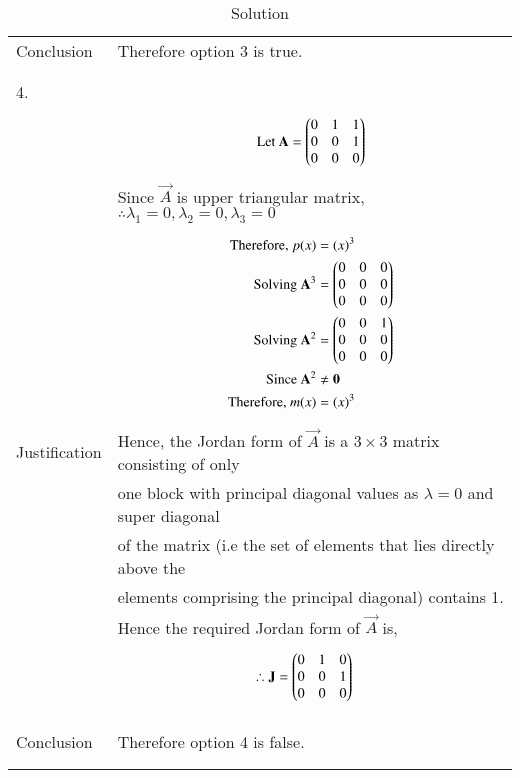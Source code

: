 \documentclass[journal,12pt]{IEEEtran}
\begin{document}
\begin{longtable}{|l|l|}
Conclusion&Therefore option 3 is true.\\
&\\
\hline
\pagebreak
\hline
&\\
4.&\\
&\parbox{6cm}{\begin{align*}
    \mbox{Let }\mathbf{A}&=\begin{pmatrix}0&1&1\\0&0&1\\0&0&0\end{pmatrix}\\
\end{align*}}\\
&Since $\vec{A}$ is upper triangular matrix, $\therefore \lambda_{1}=0,\lambda_{2}=0,\lambda_{3}=0$ \\
&\parbox{6cm}{\begin{align*}
    \mbox{Therefore, }p(x)&=(x)^3\\
    \mbox{Solving }\mathbf{A}^3&=\begin{pmatrix}0&0&0\\0&0&0\\0&0&0\end{pmatrix}\\
    \mbox{Solving }\mathbf{A}^2&=\begin{pmatrix}0&0&1\\0&0&0\\0&0&0\end{pmatrix}\\
    \mbox{Since }\mathbf{A}^2&\neq \mathbf{0}\\
    \mbox{Therefore, }m(x)&=(x)^3\\
    \end{align*}}\\
Justification&Hence, the Jordan form of $\vec{A}$ is a $3 \times 3$ matrix consisting of only\\
&one block with principal diagonal values as $\lambda = 0$ and super diagonal\\
&of the matrix (i.e the set of elements that lies directly above the\\
&elements comprising the principal diagonal) contains 1.\\
&Hence the required Jordan form of $\vec{A}$ is,\\
&\parbox{6cm}{\begin{align*}
    \therefore \mathbf{J}&=\begin{pmatrix}0&1&0\\0&0&1\\0&0&0\end{pmatrix}
\end{align*}}\\
&\\
\hline
&\\
Conclusion&Therefore option 4 is false.\\
&\\
\hline
\caption{Solution}
\label{table:2}
\end{longtable}
\newpage
\end{document}
